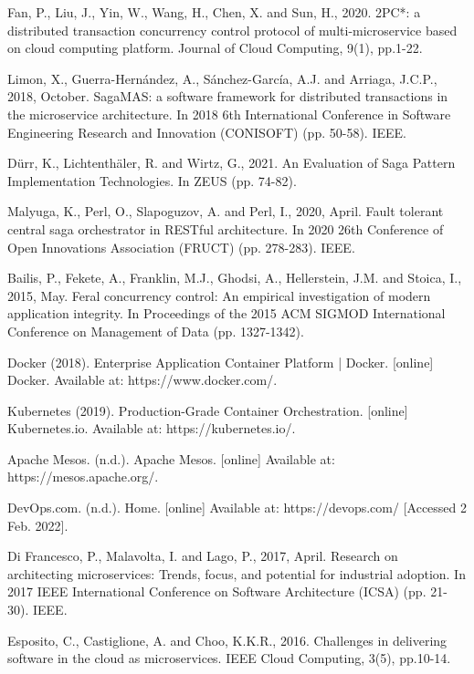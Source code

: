 \documentclass[a4paper,12pt]{article}
\begin{document}
\begin{thebibliography}{}
Fan, P., Liu, J., Yin, W., Wang, H., Chen, X. and Sun, H., 2020. 2PC*: a distributed transaction concurrency control protocol of multi-microservice based on cloud computing platform. Journal of Cloud Computing, 9(1), pp.1-22.

Limon, X., Guerra-Hernández, A., Sánchez-García, A.J. and Arriaga, J.C.P., 2018, October. SagaMAS: a software framework for distributed transactions in the microservice architecture. In 2018 6th International Conference in Software Engineering Research and Innovation (CONISOFT) (pp. 50-58). IEEE.

D\"{u}rr, K., Lichtenth\"{a}ler, R. and Wirtz, G., 2021. An Evaluation of Saga Pattern Implementation Technologies. In ZEUS (pp. 74-82).

Malyuga, K., Perl, O., Slapoguzov, A. and Perl, I., 2020, April. Fault tolerant central saga orchestrator in RESTful architecture. In 2020 26th Conference of Open Innovations Association (FRUCT) (pp. 278-283). IEEE.

Bailis, P., Fekete, A., Franklin, M.J., Ghodsi, A., Hellerstein, J.M. and Stoica, I., 2015, May. Feral concurrency control: An empirical investigation of modern application integrity. In Proceedings of the 2015 ACM SIGMOD International Conference on Management of Data (pp. 1327-1342).

Docker (2018). Enterprise Application Container Platform | Docker. [online] Docker. Available at: https://www.docker.com/.

Kubernetes (2019). Production-Grade Container Orchestration. [online] Kubernetes.io. Available at: https://kubernetes.io/.

Apache Mesos. (n.d.). Apache Mesos. [online] Available at: https://mesos.apache.org/.

DevOps.com. (n.d.). Home. [online] Available at: https://devops.com/ [Accessed 2 Feb. 2022].

Di Francesco, P., Malavolta, I. and Lago, P., 2017, April. Research on architecting microservices: Trends, focus, and potential for industrial adoption. In 2017 IEEE International Conference on Software Architecture (ICSA) (pp. 21-30). IEEE.

Esposito, C., Castiglione, A. and Choo, K.K.R., 2016. Challenges in delivering software in the cloud as microservices. IEEE Cloud Computing, 3(5), pp.10-14.
	

\end{thebibliography}
\end{document}

